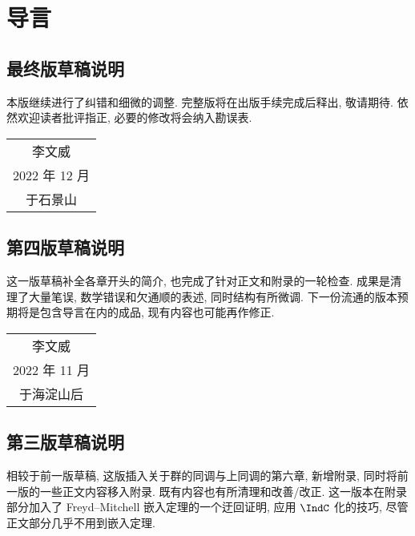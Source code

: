 \chapter*{导言}

\section*{最终版草稿说明}
本版继续进行了纠错和细微的调整. 完整版将在出版手续完成后释出, 敬请期待. 依然欢迎读者批评指正, 必要的修改将会纳入勘误表.

\vspace{1em}
\begin{flushright}\begin{minipage}{0.3 \textwidth}
		\begin{tabular}{c}
			{\fangsong 李文威} \\
			2022 年 12 月 \\
			于石景山
		\end{tabular}
\end{minipage}\end{flushright}
\vspace{1em}

\section*{第四版草稿说明}
这一版草稿补全各章开头的简介, 也完成了针对正文和附录的一轮检查. 成果是清理了大量笔误, 数学错误和欠通顺的表述, 同时结构有所微调. 下一份流通的版本预期将是包含导言在内的成品, 现有内容也可能再作修正.

\vspace{1em}
\begin{flushright}\begin{minipage}{0.3 \textwidth}
		\begin{tabular}{c}
			{\fangsong 李文威} \\
			2022 年 11 月 \\
			于海淀山后
		\end{tabular}
\end{minipage}\end{flushright}
\vspace{1em}

\section*{第三版草稿说明}
相较于前一版草稿, 这版插入关于群的同调与上同调的第六章, 新增附录, 同时将前一版的一些正文内容移入附录. 既有内容也有所清理和改善/改正. 这一版本在附录部分加入了 Freyd--Mitchell 嵌入定理的一个迂回证明, 应用 $\IndC$ 化的技巧, 尽管正文部分几乎不用到嵌入定理.


